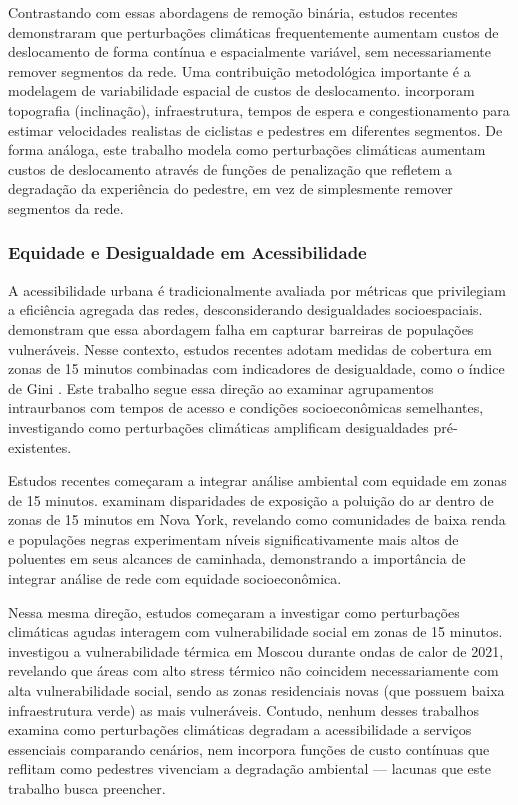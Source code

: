 Contrastando com essas abordagens de remoção binária, estudos recentes 
demonstraram que perturbações climáticas frequentemente aumentam custos de 
deslocamento de forma contínua e espacialmente variável, sem necessariamente 
remover segmentos da rede. Uma contribuição metodológica importante é a modelagem de variabilidade 
espacial de custos de deslocamento. \cite{PRITCHARD2019386} incorporam 
topografia (inclinação), infraestrutura, tempos de espera e congestionamento para 
estimar velocidades realistas de ciclistas e pedestres em diferentes segmentos. De 
forma análoga, este trabalho modela como perturbações climáticas aumentam custos de deslocamento através de funções de penalização 
que refletem a degradação da experiência do pedestre, em vez de simplesmente 
remover segmentos da rede.

\subsubsection{Equidade e Desigualdade em Acessibilidade}

A acessibilidade urbana é tradicionalmente avaliada por métricas que privilegiam 
a eficiência agregada das redes, desconsiderando desigualdades socioespaciais. 
\cite{FolGallez2014} demonstram que essa abordagem falha em capturar barreiras 
de populações vulneráveis. Nesse contexto, estudos recentes adotam medidas de 
cobertura em zonas de 15 minutos combinadas com indicadores de desigualdade, 
como o índice de Gini \cite{Bruno2024}. Este trabalho segue essa direção ao 
examinar agrupamentos intraurbanos com tempos de acesso e condições socioeconômicas semelhantes, investigando como perturbações 
climáticas amplificam desigualdades pré-existentes.

Estudos recentes começaram a integrar análise ambiental com equidade em zonas de 
15 minutos. \cite{smartcities8020053} examinam disparidades de exposição a poluição 
do ar dentro de zonas de 15 minutos em Nova York, revelando como comunidades de 
baixa renda e populações negras experimentam níveis significativamente mais altos 
de poluentes em seus alcances de caminhada, demonstrando
a importância de integrar análise de rede com equidade socioeconômica.

Nessa mesma direção, estudos começaram a investigar como perturbações climáticas 
agudas interagem com vulnerabilidade social em zonas de 15 minutos. \cite{Shartova2024} 
investigou a vulnerabilidade térmica em Moscou durante ondas de calor de 2021, 
revelando que áreas com alto stress térmico não coincidem necessariamente com alta 
vulnerabilidade social, sendo as zonas residenciais novas (que possuem baixa infraestrutura 
verde) as mais vulneráveis. Contudo, nenhum desses trabalhos examina como 
perturbações climáticas degradam a acessibilidade a serviços essenciais comparando cenários, nem incorpora funções de custo contínuas que reflitam como pedestres 
vivenciam a degradação ambiental --- lacunas que este trabalho busca preencher.

